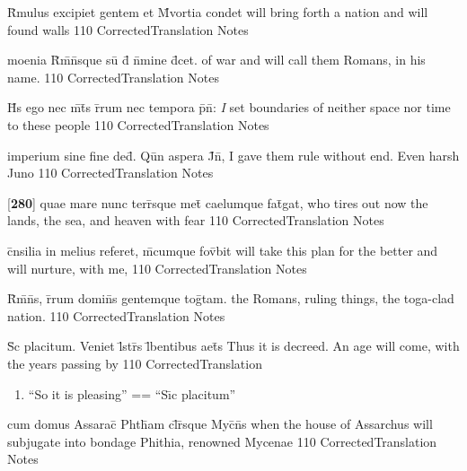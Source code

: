 \documentclass[]{book}
\begin{document}
\latline
  {R\={}mulus excipiet gentem et M\={}vortia condet}
  { will bring forth a nation and will found walls  }
  {110}
  { CorrectedTranslation }
  { Notes }


\latline
  {moenia R\={}m\={}n\={}sque su\={} d\={} n\={}mine d\={\macron {\i}}cet.}
  { of war and will call them Romans, in his name. }
  {110}
  { CorrectedTranslation }
  { Notes }


\latline
  {H\={\macron {\i}}s ego nec m\={}t\={}s r\={}rum nec tempora p\={}n\={}:}
  { \emph{I} set boundaries of neither space nor time to these people}
  {110}
  { CorrectedTranslation }
  { Notes }


\latline
  {imperium sine fine ded\={\macron {\i}}.  Qu\={\macron {\i}}n aspera J\={}n\={},}
  { I gave them rule without end.  Even harsh Juno }
  {110}
  { CorrectedTranslation }
  { Notes }


\latline
  {[\textbf{280}] quae mare nunc terr\={}sque met\={} caelumque fat\={\macron {\i}}gat,}
  { who tires out now the lands, the sea, and  heaven with fear }
  {110}
  { CorrectedTranslation }
  { Notes }


\latline
  {c\={}nsilia in melius referet, m\={}cumque fov\={}bit}
  { will take this plan for the better and will nurture, with me, }
  {110}
  { CorrectedTranslation }
  { Notes }


\latline
  {R\={}m\={}n\={}s, r\={}rum domin\={}s gentemque tog\={}tam.}
  { the Romans, ruling things, the toga-clad nation. }
  {110}
  { CorrectedTranslation }
  { Notes }


\latline
  {S\={\macron {\i}}c placitum.  Veniet l\={}str\={\macron {\i}}s l\={}bentibus aet\={}s}
  { Thus it is decreed.  An age will come, with the years passing by   }
  {110}
  { CorrectedTranslation }
  { \begin{enumerate}
  	\item ``So it is pleasing'' == ``S\={\i}c placitum''
  \end{enumerate} }


\latline
  {cum domus Assarac\={\macron {\i}} Phth\={\macron {\i}}am cl\={}r\={}sque Myc\={}n\={}s}
  { when the house of Assarchus will subjugate into bondage Phithia, renowned Mycenae }
  {110}
  { CorrectedTranslation }
  { Notes }
\end{document}
